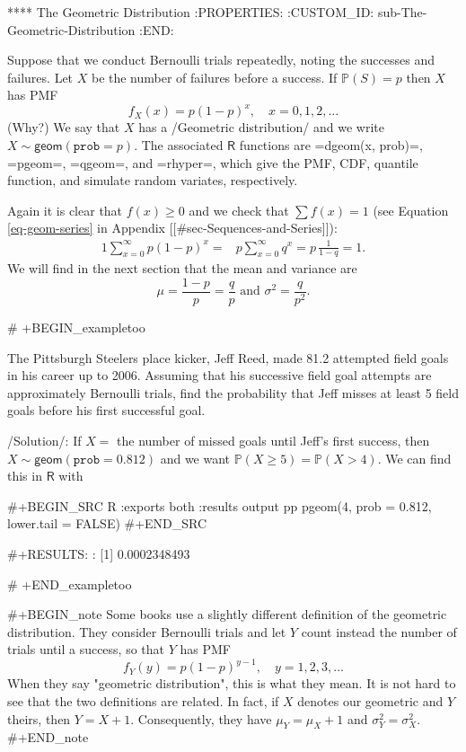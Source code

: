 {**** The Geometric Distribution
:PROPERTIES:
:CUSTOM_ID: sub-The-Geometric-Distribution
:END:

Suppose that we conduct Bernoulli trials repeatedly, noting the
successes and failures. Let \(X\) be the number of failures before a
success. If \(\mathbb{P}(S)=p\) then \(X\) has PMF
\begin{equation}
f_{X}(x)=p(1-p)^{x},\quad x=0,1,2,\ldots
\end{equation}
(Why?) We say that \(X\) has a /Geometric distribution/ and we write
\(X\sim\mathsf{geom}(\mathtt{prob}=p)\). The associated \(\mathsf{R}\)
functions are =dgeom(x, prob)=, =pgeom=, =qgeom=, and =rhyper=, which
give the PMF, CDF, quantile function, and simulate random variates,
respectively.

Again it is clear that \(f(x)\geq0\) and we check that \(\sum f(x)=1\)
(see Equation \eqref{eq-geom-series} in Appendix [[#sec-Sequences-and-Series]]):
\begin{alignat*}{1}
\sum_{x=0}^{\infty}p(1-p)^{x}= & p\sum_{x=0}^{\infty}q^{x}=p\,\frac{1}{1-q}=1.
\end{alignat*}
We will find in the next section that the mean and variance are
\begin{equation}
\mu=\frac{1-p}{p}=\frac{q}{p}\mbox{ and }\sigma^{2}=\frac{q}{p^{2}}.
\end{equation}

# +BEGIN_exampletoo

The Pittsburgh Steelers place kicker, Jeff Reed, made 81.2%
attempted field goals in his career up to 2006. Assuming that his
successive field goal attempts are approximately Bernoulli trials,
find the probability that Jeff misses at least 5 field goals before
his first successful goal.

/Solution/: If \(X=\) the number of missed goals until Jeff's first
success, then \(X\sim\mathsf{geom}(\mathtt{prob}=0.812)\) and we want
\(\mathbb{P}(X\geq5)=\mathbb{P}(X>4)\). We can find this in
\(\mathsf{R}\) with

#+BEGIN_SRC R :exports both :results output pp  
pgeom(4, prob = 0.812, lower.tail = FALSE)
#+END_SRC

#+RESULTS:
: [1] 0.0002348493

# +END_exampletoo


#+BEGIN_note
Some books use a slightly different definition of the geometric
distribution. They consider Bernoulli trials and let \(Y\) count
instead the number of trials until a success, so that \(Y\) has PMF
\begin{equation}
f_{Y}(y)=p(1-p)^{y-1},\quad y=1,2,3,\ldots
\end{equation}
When they say "geometric distribution", this is what they mean. It
is not hard to see that the two definitions are related. In fact, if
\(X\) denotes our geometric and \(Y\) theirs, then
\(Y=X+1\). Consequently, they have \(\mu_{Y}=\mu_{X}+1\) and
\(\sigma_{Y}^{2}=\sigma_{X}^{2}\).
#+END_note

}
